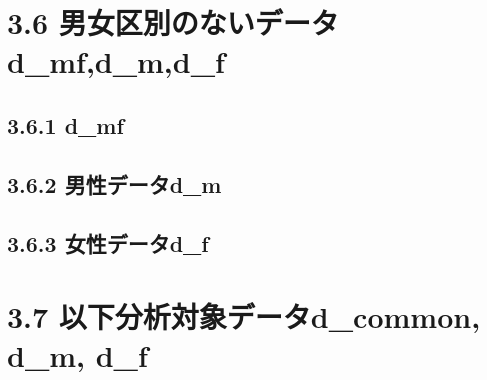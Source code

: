 %
%
%
%
%
%
%
%








\section{3.6 男女区別のないデータ d\_mf,d\_m,d\_f}

\subsection{3.6.1 d\_mf}



\subsection{3.6.2 男性データd\_m}


\subsection{3.6.3 女性データd\_f}



\section{3.7 以下分析対象データd\_common, d\_m, d\_f}








